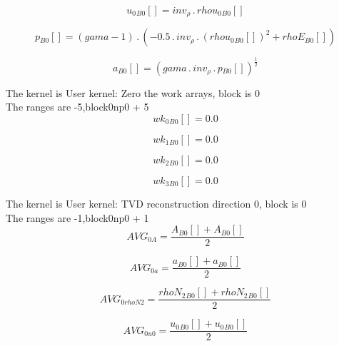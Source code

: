 \documentclass{article}
\begin{document}
\begin{dmath}{u_{0}{_{B0}}}[{}] = inv_{\rho} \,.\, {rhou_{0}{_{B0}}}[{}]\end{dmath}

\begin{dmath}{p{_{B0}}}[{}] = \left(gama - 1\right) \,.\, \left(- 0.5 \,.\, inv_{\rho} \,.\, \left({rhou_{0}{_{B0}}}[{}] \right)^{2} + {rhoE{_{B0}}}[{}]\right)\end{dmath}

\begin{dmath}{a{_{B0}}}[{}] = \left(gama \,.\, inv_{\rho} \,.\, {p{_{B0}}}[{}] \right)^{\frac{1}{2}}\end{dmath}

\noindent The kernel is User kernel: Zero the work arrays, block is 0\\\noindent The ranges are -5,block0np0 + 5\\\begin{dmath}{wk_{0}{_{B0}}}[{}] = 0.0\end{dmath}

\begin{dmath}{wk_{1}{_{B0}}}[{}] = 0.0\end{dmath}

\begin{dmath}{wk_{2}{_{B0}}}[{}] = 0.0\end{dmath}

\begin{dmath}{wk_{3}{_{B0}}}[{}] = 0.0\end{dmath}

\noindent The kernel is User kernel: TVD reconstruction direction 0, block is 0\\\noindent The ranges are -1,block0np0 + 1\\\begin{dmath}AVG_{0 A} = \frac{{A{_{B0}}}[{}] + {A{_{B0}}}[{}]}{2}\end{dmath}

\begin{dmath}AVG_{0 a} = \frac{{a{_{B0}}}[{}] + {a{_{B0}}}[{}]}{2}\end{dmath}

\begin{dmath}AVG_{0 rhoN2} = \frac{{rhoN_{2}{_{B0}}}[{}] + {rhoN_{2}{_{B0}}}[{}]}{2}\end{dmath}

\begin{dmath}AVG_{0 u0} = \frac{{u_{0}{_{B0}}}[{}] + {u_{0}{_{B0}}}[{}]}{2}\end{dmath}
\end{document}
